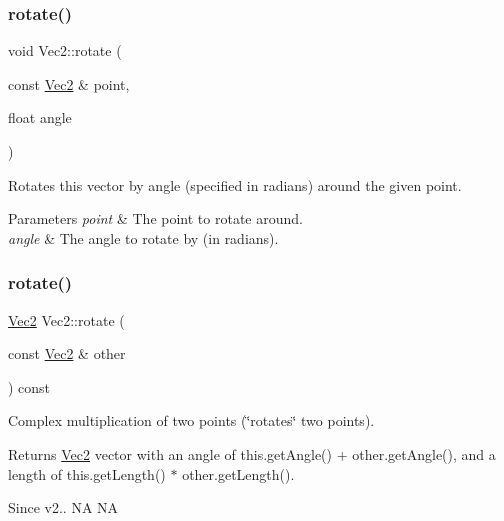 \subsubsection{\texorpdfstring{rotate()}{rotate()}\hspace{0.1cm}{\footnotesize\ttfamily [2/4]}}
{\footnotesize\ttfamily void Vec2\+::rotate (\begin{DoxyParamCaption}\item[{const \hyperlink{classVec2}{Vec2} \&}]{point,  }\item[{float}]{angle }\end{DoxyParamCaption})}

Rotates this vector by angle (specified in radians) around the given point.


\begin{DoxyParams}{Parameters}
{\em point} & The point to rotate around. \\
\hline
{\em angle} & The angle to rotate by (in radians). \\
\hline
\end{DoxyParams}
\mbox{\label{classVec2_a992d4d9ea1c60c30d7a21b8c1f003dcc}} 
\subsubsection{\texorpdfstring{rotate()}{rotate()}\hspace{0.1cm}{\footnotesize\ttfamily [3/4]}}
{\footnotesize\ttfamily \hyperlink{classVec2}{Vec2} Vec2\+::rotate (\begin{DoxyParamCaption}\item[{const \hyperlink{classVec2}{Vec2} \&}]{other }\end{DoxyParamCaption}) const\hspace{0.3cm}{\ttfamily [inline]}}

Complex multiplication of two points (\char`\"{}rotates\char`\"{} two points). \begin{DoxyReturn}{Returns}
\hyperlink{classVec2}{Vec2} vector with an angle of this.\+get\+Angle() + other.\+get\+Angle(), and a length of this.\+get\+Length() $\ast$ other.\+get\+Length(). 
\end{DoxyReturn}
\begin{DoxySince}{Since}
v2..  NA  NA 
\end{DoxySince}
\mbox{\label{classVec2_a992d4d9ea1c60c30d7a21b8c1f003dcc}} 

